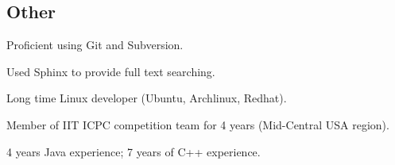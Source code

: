 \documentclass{resume}
\begin{document}
\subsection{Other}
\begin{compactitem}
  \item Proficient using Git and Subversion.
  \item Used Sphinx to provide full text searching.
  \item Long time Linux developer (Ubuntu, Archlinux, Redhat).
  \item Member of IIT ICPC competition team for 4 years (Mid-Central USA region).
  \item 4 years Java experience; 7 years of C++ experience.
\end{compactitem}
\end{document}
